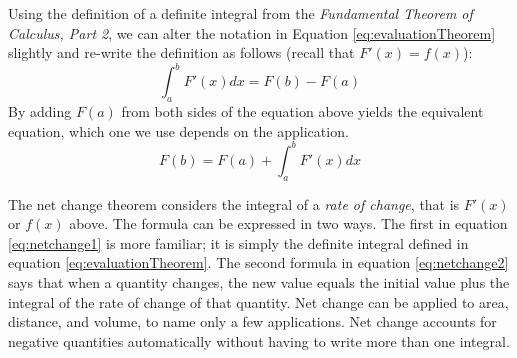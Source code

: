 \begin{tcolorbox}[title = {Net Change Theorem}]%
Using the definition of a definite integral from the \emph{Fundamental Theorem of Calculus, Part 2}, we can alter the notation in Equation \ref{eq:evaluationTheorem} slightly and re-write the definition as follows (recall that $ F'(x)=f(x)$): 
\begin{equation}\label{eq:netchange1}
\int_{a}^{b} F'(x) dx= F(b)-F(a)
\end{equation}
By adding $F(a)$ from both sides of the equation above yields the equivalent equation, which one we use depends on the application.
\begin{equation}\label{eq:netchange2}
    F(b)=F(a)+\int_{a}^{b} F'(x) dx
\end{equation}
\end{tcolorbox}

\noindent The net change theorem considers the integral of a \emph{rate of change}, that is $F'(x)$ or $f(x)$ above.  The formula can be expressed in two ways. The first in equation \ref{eq:netchange1} is more familiar; it is simply the definite integral defined in equation \ref{eq:evaluationTheorem}. The second formula in equation \ref{eq:netchange2} says that when a quantity changes, the new value equals the initial value plus the integral of the rate of change of that quantity. Net change can be applied to area, distance, and volume, to name only a few applications. Net change accounts for negative quantities automatically without having to write more than
one integral.

